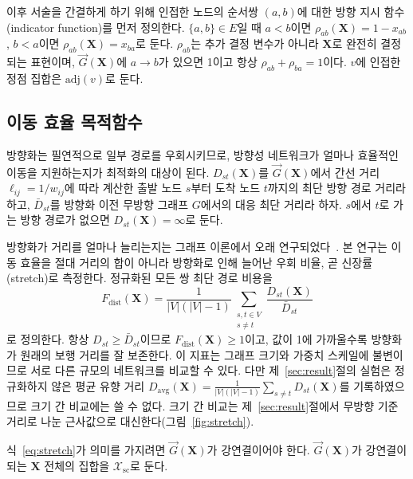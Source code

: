 \documentclass[twocolumn,a4paper]{article}
\begin{document}
이후 서술을 간결하게 하기 위해 인접한 노드의 순서쌍 \((a,b)\)에 대한 방향 지시 함수(indicator function)를 먼저 정의한다.
\(\{a,b\}\in E\)일 때 \(a<b\)이면 \(\rho_{ab}(\mathbf{X})=1-x_{ab}\), \(b<a\)이면 \(\rho_{ab}(\mathbf{X})=x_{ba}\)로 둔다.
\(\rho_{ab}\)는 추가 결정 변수가 아니라 \(\mathbf{X}\)로 완전히 결정되는 표현이며, \(\vec{G}(\mathbf{X})\)에 \(a\rightarrow b\)가 있으면 1이고 항상 \(\rho_{ab}+\rho_{ba}=1\)이다. \(v\)에 인접한 정점 집합은 \(\mathrm{adj}(v)\)로 둔다.

\subsection{이동 효율 목적함수}

방향화는 필연적으로 일부 경로를 우회시키므로, 방향성 네트워크가 얼마나 효율적인 이동을 지원하는지가 최적화의 대상이 된다. \(D_{st}(\mathbf{X})\)를 \(\vec{G}(\mathbf{X})\)에서 간선 거리 \(\ell_{ij}=1/w_{ij}\)에 따라 계산한 출발 노드 \(s\)부터 도착 노드 \(t\)까지의 최단 방향 경로 거리라 하고, \(\bar{D}_{st}\)를 방향화 이전 무방향 그래프 \(G\)에서의 대응 최단 거리라 하자. \(s\)에서 \(t\)로 가는 방향 경로가 없으면 \(D_{st}(\mathbf{X})=\infty\)로 둔다.

방향화가 거리를 얼마나 늘리는지는 그래프 이론에서 오래 연구되었다~\cite{chvatal1978distances}. 본 연구는 이동 효율을 절대 거리의 합이 아니라 방향화로 인해 늘어난 우회 비율, 곧 신장률(stretch)로 측정한다. 정규화된 모든 쌍 최단 경로 비용을
\begin{equation}
F_{\mathrm{dist}}(\mathbf{X})=\frac{1}{|V|(|V|-1)}\sum_{\substack{s,t\in V\\s\neq t}}\frac{D_{st}(\mathbf{X})}{\bar{D}_{st}}
\label{eq:stretch}
\end{equation}
로 정의한다. 항상 \(D_{st}\geq\bar{D}_{st}\)이므로 \(F_{\mathrm{dist}}(\mathbf{X})\geq1\)이고, 값이 1에 가까울수록 방향화가 원래의 보행 거리를 잘 보존한다. 이 지표는 그래프 크기와 가중치 스케일에 불변이므로 서로 다른 규모의 네트워크를 비교할 수 있다. 다만 제~\ref{sec:result}절의 실험은 정규화하지 않은 평균 유향 거리 \(D_{\mathrm{avg}}(\mathbf{X})=\frac{1}{|V|(|V|-1)}\sum_{s\neq t}D_{st}(\mathbf{X})\)를 기록하였으므로 크기 간 비교에는 쓸 수 없다. 크기 간 비교는 제~\ref{sec:result}절에서 무방향 기준 거리로 나눈 근사값으로 대신한다(그림~\ref{fig:stretch}).

식~\eqref{eq:stretch}가 의미를 가지려면 \(\vec{G}(\mathbf{X})\)가 강연결이어야 한다. \(\vec{G}(\mathbf{X})\)가 강연결이 되는 \(\mathbf{X}\) 전체의 집합을 \(\mathcal{X}_{\mathrm{sc}}\)로 둔다.
\end{document}
